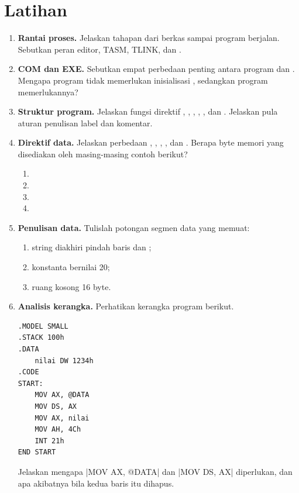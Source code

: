 \section{Latihan}
\label{sec:latihan-bab7}

\begin{enumerate}
    \item \textbf{Rantai proses.} Jelaskan tahapan dari berkas
           sampai program berjalan. Sebutkan peran
          editor, TASM, TLINK, dan .

    \item \textbf{COM dan EXE.} Sebutkan empat perbedaan penting
          antara program  dan . Mengapa
          program  tidak memerlukan inisialisasi
          , sedangkan program  memerlukannya?

    \item \textbf{Struktur program.} Jelaskan fungsi direktif
          , , , ,
          , dan . Jelaskan pula aturan
          penulisan label dan komentar.

    \item \textbf{Direktif data.} Jelaskan perbedaan ,
          , , , dan . Berapa byte
          memori yang disediakan oleh masing-masing contoh berikut?
          \begin{enumerate}
              \item {}
              \item {}
              \item {}
              \item {}
          \end{enumerate}

    \item \textbf{Penulisan data.} Tulislah potongan segmen data
          yang memuat:
          \begin{enumerate}
              \item string  diakhiri pindah
                    baris dan ;
              \item konstanta  bernilai 20;
              \item ruang kosong 16 byte.
          \end{enumerate}

    \item \textbf{Analisis kerangka.} Perhatikan kerangka program
          berikut.
          \begin{lstlisting}[language=MASM, numbers=none]
.MODEL SMALL
.STACK 100h
.DATA
    nilai DW 1234h
.CODE
START:
    MOV AX, @DATA
    MOV DS, AX
    MOV AX, nilai
    MOV AH, 4Ch
    INT 21h
END START
          \end{lstlisting}
          Jelaskan mengapa \lstasm|MOV AX, @DATA| dan
          \lstasm|MOV DS, AX| diperlukan, dan apa akibatnya bila
          kedua baris itu dihapus.


\end{enumerate}
